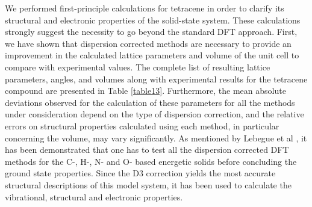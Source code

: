 We performed first-principle calculations for tetracene in order to clarify its structural and electronic properties of the solid-state system. These calculations strongly suggest the necessity to go beyond the standard DFT approach. First, we have shown that dispersion corrected methods are necessary to provide an improvement in the calculated lattice parameters and volume of the unit cell to compare with experimental values. The complete list of resulting lattice parameters, angles, and volumes along with experimental results for the tetracene compound are presented in Table \ref{table13}. Furthermore, the mean absolute deviations observed for the calculation of these parameters for all the methods under consideration depend on the type of dispersion correction, and the relative errors on structural properties calculated using each method, in particular concerning the volume, may vary significantly. As mentioned by Lebegue et al \cite{appalakondaiah2015dispersion}, it has been demonstrated that one has to test all the dispersion corrected DFT methods for the C-, H-, N- and O- based energetic solids before concluding the ground state properties. Since the D3 correction yields the most accurate structural descriptions of this model system, it has been used to calculate the vibrational, structural and electronic properties.\\
 
